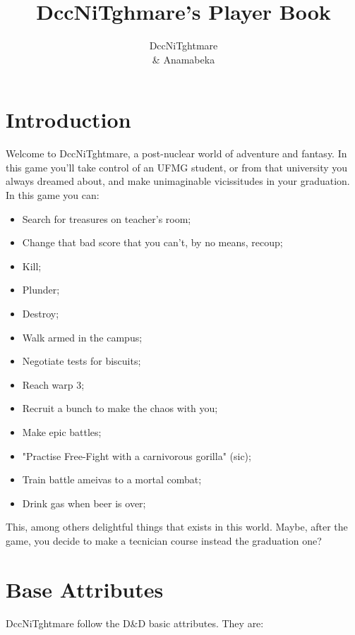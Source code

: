 \documentclass[ letterpaper,12pt]{article}
\begin{document}
\title{\textbf{DccNiTghmare's Player Book}}

\author{
DccNiTghtmare\\ \& Anamabeka
}

\maketitle
{}



\newpage

\tableofcontents

\newpage
\section{Introduction}

Welcome to DccNiTghtmare, a post-nuclear world of adventure and fantasy. In this
game you'll take control of an UFMG student, or from that university you always
dreamed about, and make unimaginable vicissitudes in your graduation. In this
game you can:

\begin{itemize}
\item{Search for treasures on teacher's room;}
\item{Change that bad score that you can't, by no means, recoup;}
\item{Kill;}
\item{Plunder;}
\item{Destroy;}
\item{Walk armed in the campus;}
\item{Negotiate tests for biscuits;}
\item{Reach warp 3;}
\item{Recruit a bunch to make the chaos with you;}
\item{Make epic battles;}
\item{"Practise Free-Fight with a carnivorous gorilla" (sic);}
\item{Train battle ameivas to a mortal combat;}
\item{Drink gas when beer is over;}
\end{itemize}

This, among others delightful things that exists in this world. Maybe, after the game, you decide to make a tecnician course instead the graduation one?

\section{Base Attributes}
DccNiTghtmare follow the D\&D basic attributes. They are:
\end{document}
